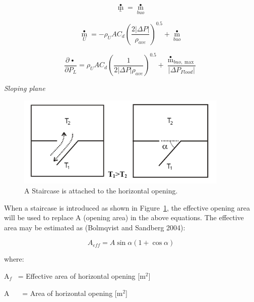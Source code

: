 \begin{equation}
{\mathop m\limits^ \bullet_{_L}} = {\mathop m\limits^ \bullet_{buo}}
\end{equation}

\begin{equation}
{\mathop m\limits^ \bullet_U} =  - {\rho_U}A{C_d}{\left( {\frac{{2\left| {\Delta P} \right|}}{{{\rho_{ave}}}}} \right)^{0.5}} + {\mathop m\limits^ \bullet_{buo}}
\end{equation}

\begin{equation}
\frac{{\partial \mathop {{m_U}}\limits^ \bullet  }}{{\partial {P_L}}} = {\rho_U}A{C_d}{\left( {\frac{1}{{2\left| {\Delta P} \right|{\rho_{ave}}}}} \right)^{0.5}} + \frac{{{{\mathop m\limits^ \bullet  }_{buo,\max }}}}{{\left| {\Delta {P_{Flood}}} \right|}}
\end{equation}

\emph{Sloping plane}

\begin{figure}[hbtp] %
\centering
\includegraphics[width=0.9\textwidth, height=0.9\textheight, keepaspectratio=true]{media/image2741.png}
\caption{A Staircase is attached to the horizontal opening. \protect \label{fig:a-staircase-is-attached-to-the-horizontal}}
\end{figure}

When a staircase is introduced as shown in Figure~\ref{fig:a-staircase-is-attached-to-the-horizontal}, the effective opening area will be used to replace A (opening area) in the above equations. The effective area may be estimated as (Bolmqvist and Sandberg 2004):

\begin{equation}
{A_{eff}} = A\sin \alpha (1 + \cos \alpha )
\end{equation}

where:

A\(_{f}\)~ = Effective area of horizontal opening {[}m\(^{2}\){]}

A~~~ = Area of horizontal opening {[}m\(^{2}\){]}

